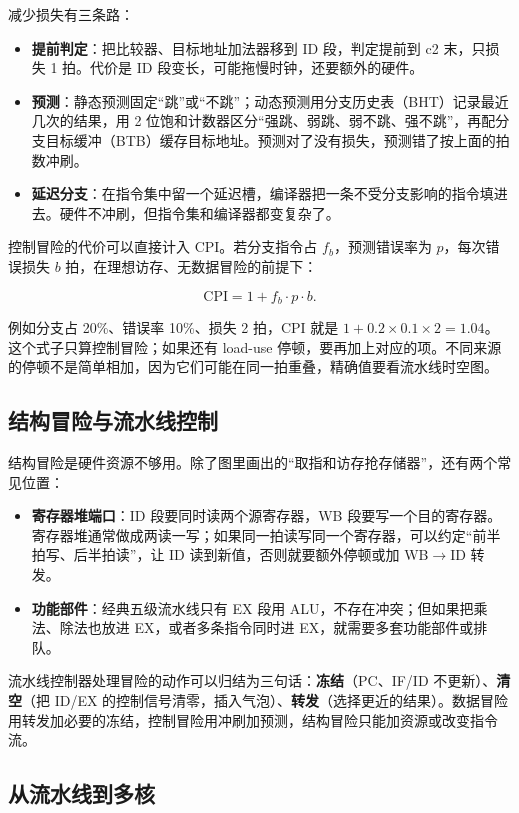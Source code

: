 减少损失有三条路：

\begin{itemize}
  \item \textbf{提前判定}：把比较器、目标地址加法器移到 ID 段，判定提前到 c2 末，只损失 1 拍。代价是 ID 段变长，可能拖慢时钟，还要额外的硬件。
  \item \textbf{预测}：静态预测固定“跳”或“不跳”；动态预测用分支历史表（BHT）记录最近几次的结果，用 2 位饱和计数器区分“强跳、弱跳、弱不跳、强不跳”，再配分支目标缓冲（BTB）缓存目标地址。预测对了没有损失，预测错了按上面的拍数冲刷。
  \item \textbf{延迟分支}：在指令集中留一个延迟槽，编译器把一条不受分支影响的指令填进去。硬件不冲刷，但指令集和编译器都变复杂了。
\end{itemize}

控制冒险的代价可以直接计入 CPI。若分支指令占 $f_b$，预测错误率为 $p$，每次错误损失 $b$ 拍，在理想访存、无数据冒险的前提下：

\[
\text{CPI}=1+f_b\cdot p\cdot b.
\]

例如分支占 20\%、错误率 10\%、损失 2 拍，CPI 就是 $1+0.2\times0.1\times2=1.04$。这个式子只算控制冒险；如果还有 load-use 停顿，要再加上对应的项。不同来源的停顿不是简单相加，因为它们可能在同一拍重叠，精确值要看流水线时空图。

\subsection{结构冒险与流水线控制}

结构冒险是硬件资源不够用。除了图里画出的“取指和访存抢存储器”，还有两个常见位置：

\begin{itemize}
  \item \textbf{寄存器堆端口}：ID 段要同时读两个源寄存器，WB 段要写一个目的寄存器。寄存器堆通常做成两读一写；如果同一拍读写同一个寄存器，可以约定“前半拍写、后半拍读”，让 ID 读到新值，否则就要额外停顿或加 WB$\to$ID 转发。
  \item \textbf{功能部件}：经典五级流水线只有 EX 段用 ALU，不存在冲突；但如果把乘法、除法也放进 EX，或者多条指令同时进 EX，就需要多套功能部件或排队。
\end{itemize}

流水线控制器处理冒险的动作可以归结为三句话：\textbf{冻结}（PC、IF/ID 不更新）、\textbf{清空}（把 ID/EX 的控制信号清零，插入气泡）、\textbf{转发}（选择更近的结果）。数据冒险用转发加必要的冻结，控制冒险用冲刷加预测，结构冒险只能加资源或改变指令流。

\subsection{从流水线到多核}


